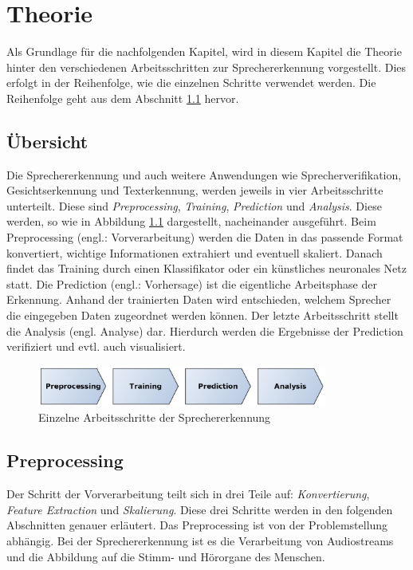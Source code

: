 \chapter{Theorie}
\label{cha:theorie}
Als Grundlage für die nachfolgenden Kapitel, wird in diesem Kapitel die Theorie hinter den verschiedenen Arbeitsschritten zur Sprechererkennung vorgestellt. Dies erfolgt in der Reihenfolge, wie die einzelnen Schritte verwendet werden. Die Reihenfolge geht aus dem Abschnitt \ref{sec:uebersicht} hervor.

\section{Übersicht}
\label{sec:uebersicht}
Die Sprechererkennung und auch weitere Anwendungen wie Sprecherverifikation, Gesichtserkennung und Texterkennung, werden jeweils in vier Arbeitsschritte unterteilt. Diese sind \emph{Preprocessing}, \emph{Training}, \emph{Prediction} und \emph{Analysis}. Diese werden, so wie in Abbildung \ref{fig:allgemeinerAblauf} dargestellt, nacheinander ausgeführt. Beim Preprocessing (engl.: Vorverarbeitung) werden die Daten in das passende Format konvertiert, wichtige Informationen extrahiert und eventuell skaliert. Danach findet das Training durch einen Klassifikator oder ein künstliches neuronales Netz statt. Die Prediction (engl.: Vorhersage) ist die eigentliche Arbeitsphase der Erkennung. Anhand der trainierten Daten wird entschieden, welchem Sprecher die eingegeben Daten zugeordnet werden können. Der letzte Arbeitsschritt stellt die Analysis (engl. Analyse) dar. Hierdurch werden die Ergebnisse der Prediction verifiziert und evtl. auch visualisiert.

\begin{figure}[h]
  \centering
  \includegraphics[width=0.85\textwidth]{images/allgemeinerAblauf}
  \caption{Einzelne Arbeitsschritte der Sprechererkennung}
  \label{fig:allgemeinerAblauf}
\end{figure}

\section{Preprocessing}
Der Schritt der Vorverarbeitung teilt sich in drei Teile auf: \emph{Konvertierung}, \emph{Feature Extraction} und \emph{Skalierung}. Diese drei Schritte werden in den folgenden Abschnitten genauer erläutert. Das Preprocessing ist von der Problemstellung abhängig. Bei der Sprechererkennung ist es die Verarbeitung von Audiostreams und die Abbildung auf die Stimm- und Hörorgane des Menschen.

